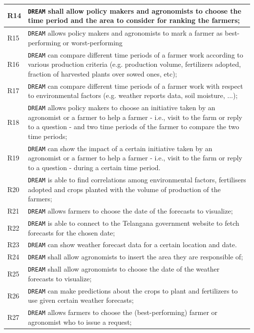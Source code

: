 \documentclass{article}
\begin{document}
\begin{longtable}[c]{|m{0.75cm}|m{11cm}|}
  \hline
R14\label{R} & \verb|DREAM| shall allow policy makers and agronomists to choose the time period and the area to consider for ranking the farmers;\\
  \hline
  R15\label{R} & \verb|DREAM| allows policy makers and agronomists to mark a farmer as best-performing or worst-performing\\
  \hline
R16\label{R} & \verb|DREAM| can compare different time periods of a farmer work according to various production criteria (e.g. production volume, fertilizers adopted, fraction of harvested plants over sowed ones, etc);\\
  \hline
R17\label{R} & \verb|DREAM| can compare different time periods of a  farmer work with respect to environmental factors (e.g. weather reports data, soil moisture, ...);\\
  \hline
R18\label{R} & \verb|DREAM| allows policy makers to choose an initiative taken by an agronomist or a farmer to help a farmer - i.e., visit to the farm or reply to a question - and two time periods of the farmer to compare the two time periods;\\
  \hline
R19\label{R} & \verb|DREAM| can show the impact of a certain initiative taken by an agronomist or a farmer to help a farmer - i.e., visit to the farm or reply to a question - during a certain time period.\\
  \hline
  R20\label{R} & \verb|DREAM| is able to find correlations among environmental factors, fertilisers adopted and crops planted with the volume of production of the farmers;\\
  \hline
R21\label{R} & \verb|DREAM| allows farmers to choose the date of the forecasts to visualize;\\
  \hline
R22\label{R} & \verb|DREAM| is able to connect to the Telangana government website to fetch forecasts for the chosen date;\\
  \hline
R23\label{R} & \verb|DREAM| can show weather forecast data for a certain location and date.\\
  \hline
R24\label{R} & \verb|DREAM| shall allow agronomists to insert the area they are responsible of;\\
  \hline
R25\label{R} & \verb|DREAM| shall allow agronomists to choose the date of the weather forecasts to visualize;\\
  \hline
R26\label{R} & \verb|DREAM| can make predictions about the crops to plant and fertilizers to use given certain weather forecasts;\\
  \hline
R27\label{R} & \verb|DREAM| allows farmers to choose the (best-performing) farmer or agronomist who to issue a request;\\

\end{longtable}
\end{document}

